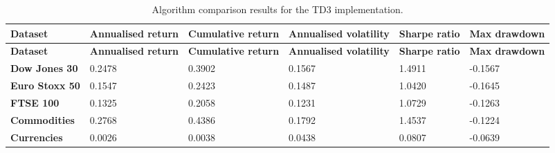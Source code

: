 \begin{longtable}{|l|p{2.1cm}|p{2.1cm}|p{2.1cm}|p{1.5cm}|p{2cm}|}
    \caption{Algorithm comparison results for the TD3 implementation.}
    \label{tab:experiment_algorithms_td3}
    \\ 
    \hline
    \textbf{Dataset} & \textbf{Annualised return} & \textbf{Cumulative return} & \textbf{Annualised volatility} & \textbf{Sharpe ratio} & \textbf{Max drawdown}  \\ \midrule
    \endfirsthead

    \hline
    \textbf{Dataset} & \textbf{Annualised return} & \textbf{Cumulative return} & \textbf{Annualised volatility} & \textbf{Sharpe ratio} & \textbf{Max drawdown}  \\ \midrule
    \endhead

    \endfoot
    \hline

    \textbf{Dow Jones 30} & 0.2478 & 0.3902 & 0.1567 & 1.4911 & -0.1567 \\ \hline
    \textbf{Euro Stoxx 50} & 0.1547 & 0.2423 & 0.1487 & 1.0420 & -0.1645 \\ \hline
    \textbf{FTSE 100} & 0.1325 & 0.2058 & 0.1231 & 1.0729 & -0.1263 \\ \hline
    \textbf{Commodities} & 0.2768 & 0.4386 & 0.1792 & 1.4537 & -0.1224 \\ \hline
    \textbf{Currencies} & 0.0026 & 0.0038 & 0.0438 & 0.0807 & -0.0639 \\ \hline
\end{longtable}